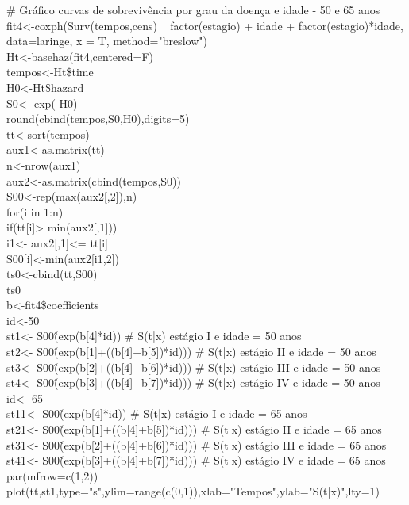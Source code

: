 \documentclass[12pt,a4paper]{article}
\begin{document}
 	\# Gráfico curvas de sobrevivência por grau da doença e idade - 50 e 65 anos\\
 	fit4<-coxph(Surv(tempos,cens) ~ factor(estagio) + idade + factor(estagio)*idade,
 	data=laringe, x = T, method="breslow")\\
 	Ht<-basehaz(fit4,centered=F)\\
 	tempos<-Ht\$time\\
 	H0<-Ht\$hazard\\
 	S0<- exp(-H0)\\
 	round(cbind(tempos,S0,H0),digits=5)\\
 	tt<-sort(tempos)\\
 	aux1<-as.matrix(tt)\\
 	n<-nrow(aux1)\\
 	aux2<-as.matrix(cbind(tempos,S0))\\
 	S00<-rep(max(aux2[,2]),n)\\
 	for(i in 1:n){\\
 	if(tt[i]> min(aux2[,1])){\\
 	i1<- aux2[,1]<= tt[i]\\
 	S00[i]<-min(aux2[i1,2])}}\\
 	ts0<-cbind(tt,S00)\\
 	ts0\\
 	b<-fit4\$coefficients\\
 	id<-50\\
 	st1<- S00\^(exp(b[4]*id))                \# S(t|x) estágio I   e idade = 50 anos\\
 	st2<- S00\^(exp(b[1]+((b[4]+b[5])*id)))  \# S(t|x) estágio II  e idade = 50 anos\\
 	st3<- S00\^(exp(b[2]+((b[4]+b[6])*id)))  \# S(t|x) estágio III e idade = 50 anos\\
 	st4<- S00\^(exp(b[3]+((b[4]+b[7])*id)))  \# S(t|x) estágio IV  e idade = 50 anos\\
 	id<- 65\\
 	st11<- S00\^(exp(b[4]*id))               \# S(t|x) estágio I   e idade = 65 anos\\
 	st21<- S00\^(exp(b[1]+((b[4]+b[5])*id))) \# S(t|x) estágio II  e idade = 65 anos\\
 	st31<- S00\^(exp(b[2]+((b[4]+b[6])*id))) \# S(t|x) estágio III e idade = 65 anos\\
 	st41<- S00\^(exp(b[3]+((b[4]+b[7])*id))) \# S(t|x) estágio IV  e idade = 65 anos\\
 	par(mfrow=c(1,2))\\
 	plot(tt,st1,type="s",ylim=range(c(0,1)),xlab="Tempos",ylab="S(t|x)",lty=1)\\
\end{document}
